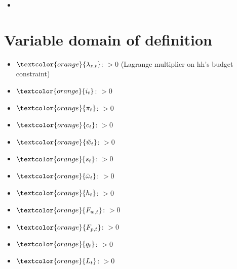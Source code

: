 \begin{itemize}
    \item 
\end{itemize}

\section{Variable domain of definition}
\begin{itemize}
    \item $ \textcolor{orange}{\lambda_{z,t}} $:  $>0$ (Lagrange multiplier on hh's budget constraint)
    \item $ \textcolor{orange}{i_t} $: $>0$
    \item $ \textcolor{orange}{\pi_t}  $: $>0$
    \item $ \textcolor{orange}{c_t} $: $>0$
    \item $ \textcolor{orange}{\tilde{w}_t} $: $>0$
    \item $ \textcolor{orange}{s_t} $: $>0$
    \item $ \textcolor{orange}{\bar{\omega}_t} $: $>0$
    \item $ \textcolor{orange}{h_t} $: $>0$
    \item $ \textcolor{orange}{F_{w,t}} $: $>0$
    \item $\textcolor{orange}{F_{p,t}} $: $>0$
    \item $\textcolor{orange}{q_t} $: $>0$
    \item $\textcolor{orange}{L_t} $: $>0$
\end{itemize}

